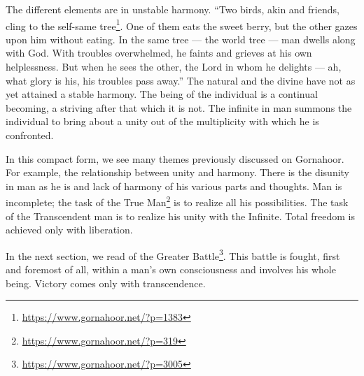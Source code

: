 \begin{quotex}
The different elements are in unstable harmony. ``Two birds, akin and friends, cling to the self-same tree\footnote{\url{https://www.gornahoor.net/?p=1383}}. One of them eats the sweet berry, but the other gazes upon him without eating. In the same tree --- the world tree --- man dwells along with God. With troubles overwhelmed, he faints and grieves at his own helplessness. But when he sees the other, the Lord in whom he delights --- ah, what glory is his, his troubles pass away.'' The natural and the divine have not as yet attained a stable harmony. The being of the individual is a continual becoming, a striving after that which it is not. The infinite in man summons the individual to bring about a unity out of the multiplicity with which he is confronted.
\end{quotex}


In this compact form, we see many themes previously discussed on Gornahoor. For example, the relationship between unity and harmony. There is the disunity in man as he is and lack of harmony of his various parts and thoughts. Man is incomplete; the task of the True Man\footnote{\url{https://www.gornahoor.net/?p=319}} is to realize all his possibilities. The task of the Transcendent man is to realize his unity with the Infinite. Total freedom is achieved only with liberation.

In the next section, we read of the Greater Battle\footnote{\url{https://www.gornahoor.net/?p=3005}}. This battle is fought, first and foremost of all, within a man's own consciousness and involves his whole being. Victory comes only with transcendence.

